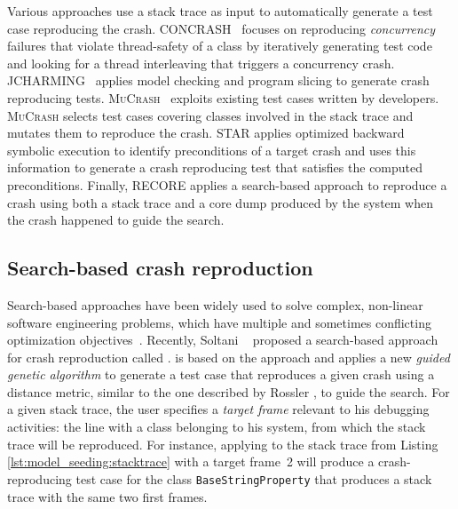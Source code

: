 Various approaches use a stack trace as input to automatically generate a test case reproducing the crash.
%
\textsc{CONCRASH}~\cite{BPT17concrash} focuses on reproducing \textit{concurrency} failures that violate thread-safety of a class by iteratively generating test code and looking for a thread interleaving that triggers a concurrency crash. %
%
\textsc{JCHARMING}~\cite{nayrolles2015jcharming,Nayrolles2017} applies model checking and program slicing to generate crash reproducing tests. %
%
\textsc{MuCrash}~\cite{Xuan2015} exploits existing test cases written by developers. \textsc{MuCrash} selects test cases covering classes involved in the stack trace and mutates them to reproduce the crash.
%
\textsc{STAR} \cite{Chen2015} applies optimized backward symbolic execution to identify preconditions of a target crash and uses this information to generate a crash reproducing test that satisfies the computed preconditions.
%
Finally, \textrm{RECORE} \cite{Rossler2013} applies a search-based approach to reproduce a crash using  both a stack trace and a core dump produced by the system when the crash happened to guide the search.


\subsection{Search-based crash reproduction}

Search-based approaches have been widely used to solve complex, non-linear software engineering problems, which  have multiple and sometimes conflicting optimization objectives~\cite{Harman2012}. Recently, Soltani \etal~\cite{soltani2017} proposed a search-based approach for crash reproduction called \evocrash. \evocrash is based on the \evosuite approach \cite{fraser2012whole,Fraser2014b} and applies a new \textit{guided genetic algorithm} to generate a test case that reproduces a given crash using a distance metric, similar to the one described by Rossler \etal \cite{Rossler2013}, to guide the search.
%
For a given stack trace, the user specifies a \emph{target frame} relevant to his debugging activities: \ie the line with a class belonging to his system, from which the stack trace will be reproduced. For instance, applying \evocrash to the stack trace from Listing \ref{lst:model_seeding:stacktrace} with a target frame~2 will produce a crash-reproducing test case for the class \texttt{BaseStringProperty} that produces a stack trace with the same two first frames. 

